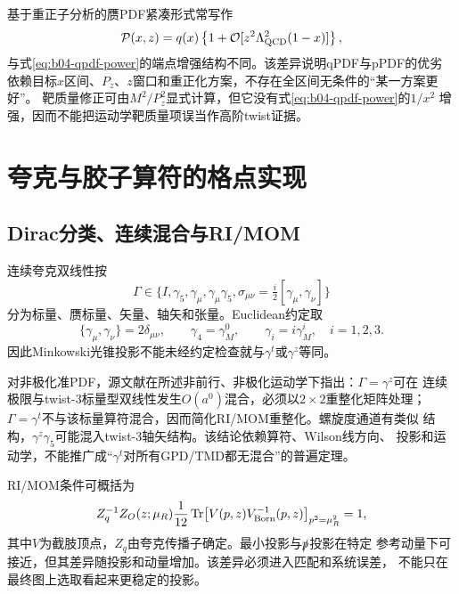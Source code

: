 基于重正子分析的赝PDF紧凑形式常写作
\begin{equation}
  \mathcal P(x,z)=q(x)\left\{1+\mathcal O[z^2\Lambda_{\rm QCD}^2(1-x)]\right\},
  \label{eq:b04-ppdf-power}
\end{equation}
与式\eqref{eq:b04-qpdf-power}的端点增强结构不同。该差异说明qPDF与pPDF的优劣
依赖目标$x$区间、$P_z$、$z$窗口和重正化方案，不存在全区间无条件的“某一方案更好”。
靶质量修正可由$M^2/P_z^2$显式计算，但它没有式\eqref{eq:b04-qpdf-power}的$1/x^2$
增强，因而不能把运动学靶质量项误当作高阶twist证据。

\chapter{夸克与胶子算符的格点实现}

\section{Dirac分类、连续混合与RI/MOM}

连续夸克双线性按
\begin{equation}
  \Gamma\in\{I,\gamma_5,\gamma_\mu,\gamma_\mu\gamma_5,
  \sigma_{\mu\nu}=\tfrac{i}{2}[\gamma_\mu,\gamma_\nu]\}
  \label{eq:b04-bilinears}
\end{equation}
分为标量、赝标量、矢量、轴矢和张量。Euclidean约定取
\begin{equation}
  \{\gamma_\mu,\gamma_\nu\}=2\delta_{\mu\nu},
  \qquad
  \gamma_4=\gamma^0_M,\qquad
  \gamma_i=i\gamma^i_M,\quad i=1,2,3.
  \label{eq:b04-euclidean-gamma}
\end{equation}
因此Minkowski光锥投影不能未经约定检查就与$\gamma^t$或$\gamma^z$等同。

对非极化准PDF，源文献在所述非前行、非极化运动学下指出：$\Gamma=\gamma^z$可在
连续极限与twist-3标量型双线性发生$O(a^0)$混合，必须以$2\times2$重整化矩阵处理；
$\Gamma=\gamma^t$不与该标量算符混合，因而简化RI/MOM重整化。螺旋度通道有类似
结构，$\gamma^z\gamma_5$可能混入twist-3轴矢结构。该结论依赖算符、Wilson线方向、
投影和运动学，不能推广成“$\gamma^t$对所有GPD/TMD都无混合”的普遍定理。

RI/MOM条件可概括为
\begin{equation}
  Z_q^{-1}Z_O(z;\mu_R)
  \frac1{12}\operatorname{Tr}
  \!\left[V(p,z)V_{\rm Born}^{-1}(p,z)\right]_{p^2=\mu_R^2}
  =1,
  \label{eq:b04-ri-mom}
\end{equation}
其中$V$为截肢顶点，$Z_q$由夸克传播子确定。最小投影与$\slashed p$投影在特定
参考动量下可接近，但其差异随投影和动量增加。该差异必须进入匹配和系统误差，
不能只在最终图上选取看起来更稳定的投影。

